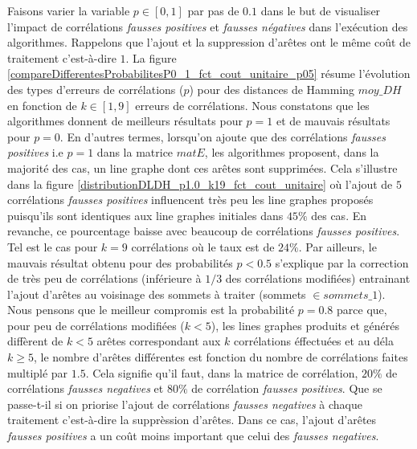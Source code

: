 \documentclass[onecolumn, 12pt]{book}
\begin{document}
Faisons varier la variable $p \in [0,1]$ par pas de $0.1$ dans le but de visualiser l'impact de corr\'elations {\em fausses positives} et {\em fausses n\'egatives} dans l'ex\'ecution des algorithmes. Rappelons que l'ajout et la suppression d'ar\^etes ont le m\^eme co\^ut de traitement c'est-\`a-dire $1$.
La figure \ref{compareDifferentesProbabilitesP0_1_fct_cout_unitaire_p05} r\'esume l'\'evolution des types d'erreurs de corr\'elations ($p$) pour des distances de Hamming $moy\_DH$ en fonction de  $k \in [1, 9]$  erreurs de corr\'elations.
\newline 
Nous constatons que les algorithmes donnent de meilleurs r\'esultats pour $p = 1$ et de mauvais r\'esultats pour $p = 0$. 
En d'autres termes, lorsqu'on ajoute que des corr\'elations {\em fausses positives} i.e $p  = 1$ dans la matrice $matE$, les algorithmes  proposent, dans la majorit\'e des cas, un line graphe dont ces ar\^etes sont supprim\'ees. Cela s'illustre dans la figure \ref{distributionDLDH_p1.0_k19_fct_cout_unitaire} o\`u l'ajout de $5$ corr\'elations {\em fausses positives} influencent tr\`es peu les line graphes propos\'es puisqu'ils sont identiques aux line graphes initiales dans $45\%$ des cas. 
En revanche, ce pourcentage baisse avec beaucoup de corr\'elations {\em fausses positives}. Tel est le cas pour $k = 9$ corr\'elations o\`u le taux est de $24\%$. 
\newline
Par ailleurs, le mauvais r\'esultat obtenu pour des probabilit\'es $p < 0.5$ s'explique par la correction de tr\`es peu  de corr\'elations (inf\'erieure \`a $1/3$ des corr\'elations modifi\'ees) entrainant l'ajout d'ar\^etes au voisinage des sommets \`a traiter (sommets $\in sommets\_1$).
\newline
Nous pensons que le meilleur compromis est la probabilit\'e $p = 0.8$ parce que, pour peu de corr\'elations modifi\'ees ($k<5$), les lines graphes produits et g\'en\'er\'es diff\`erent de $k<5$ ar\^etes correspondant aux $k$ corr\'elations \'effectu\'ees  et au d\'ela $k \geq 5$, le nombre d'ar\^etes diff\'erentes est fonction du nombre de corr\'elations faites multipl\'e par $1.5$.
Cela signifie qu'il faut, dans la matrice de corr\'elation, $20\%$ de corr\'elations {\em fausses negatives} et $80\%$ de corr\'elation {\em fausses positives}. 
\newline
Que se passe-t-il si on priorise l'ajout de corr\'elations {\em fausses negatives} \`a chaque traitement c'est-\`a-dire la suppr\`ession d'ar\^etes.  Dans ce cas, l'ajout d'ar\^etes {\em fausses positives} a un co\^ut moins important que celui des {\em fausses negatives}. 
\end{document}
